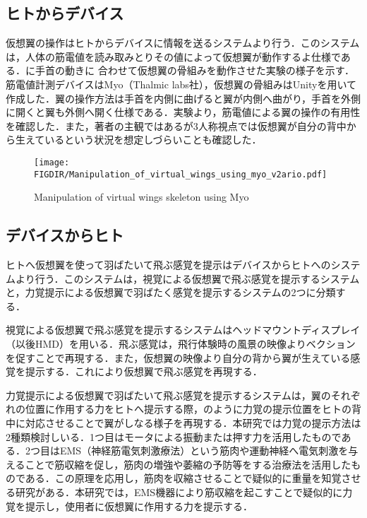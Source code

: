 \begin{small}
  \subsection{ヒトからデバイス}
    仮想翼の操作はヒトからデバイスに情報を送るシステムより行う．このシステムは，人体の筋電値を読み取みとりその値によって仮想翼が動作するよ仕様である．に手首の動きに
    合わせて仮想翼の骨組みを動作させた実験の様子を示す．筋電値計測デバイスはMyo（Thalmic labs社），仮想翼の骨組みはUnityを用いて作成した．翼の操作方法は手首を内側に曲げると翼が内側へ曲がり，手首を外側に開くと翼も外側へ開く仕様である．実験より，筋電値による翼の操作の有用性を確認した．また，著者の主観ではあるが3人称視点では仮想翼が自分の背中から生えているという状況を想定しづらいことも確認した．

    \begin{figure}[t]
      \begin{center}
        \vspace{3mm}
        \texttt{[image: \\FIGDIR/Manipulation\_of\_virtual\_wings\_using\_myo\_v2ario.pdf]}%
        \caption{Manipulation of virtual wings skeleton using Myo}
      \end{center}
    \end{figure}
    
    
  \subsection{デバイスからヒト}
    ヒトへ仮想翼を使って羽ばたいて飛ぶ感覚を提示はデバイスからヒトへのシステムより行う．このシステムは，視覚による仮想翼で飛ぶ感覚を提示するシステムと，力覚提示による仮想翼で羽ばたく感覚を提示するシステムの2つに分類する．
    
    視覚による仮想翼で飛ぶ感覚を提示するシステムはヘッドマウントディスプレイ（以後HMD）を用いる．飛ぶ感覚は，飛行体験時の風景の映像よりベクションを促すことで再現する．また，仮想翼の映像より自分の背から翼が生えている感覚を提示する．これにより仮想翼で飛ぶ感覚を再現する．

    力覚提示による仮想翼で羽ばたいて飛ぶ感覚を提示するシステムは，翼のそれぞれの位置に作用する力をヒトへ提示する際，のように力覚の提示位置をヒトの背中に対応させることで翼がしなる様子を再現する．本研究では力覚の提示方法は2種類検討しいる．1つ目はモータによる振動または押す力を活用したものである．2つ目はEMS（神経筋電気刺激療法）という筋肉や運動神経へ電気刺激を与えることで筋収縮を促し，筋肉の増強や萎縮の予防等をする治療法を活用したものである．この原理を応用し，筋肉を収縮させることで疑似的に重量を知覚させる研究がある\cite{小川剛史2017電気的筋肉刺激が重量知覚に及ぼす影響の分析}．本研究では，EMS機器により筋収縮を起こすことで疑似的に力覚を提示し，使用者に仮想翼に作用する力を提示する．




\end{small}
